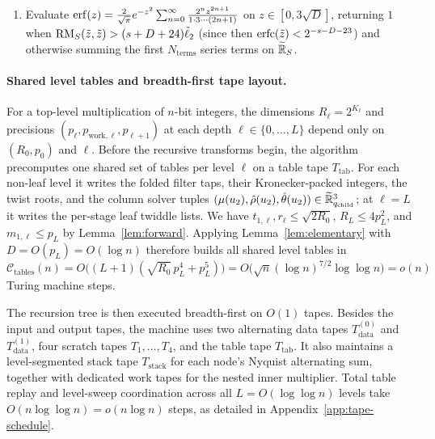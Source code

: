 \begin{lemma}
\begin{enumerate}[label=(\roman*),leftmargin=*]
  \item Evaluate $\operatorname{erf}(z) = \frac{2}{\sqrt{\pi}} e^{-z^2}\allowbreak \sum_{n=0}^\infty \frac{2^n z^{2n+1}}{1 \cdot 3 \cdots (2n+1)}$ on $z \in [0, 3\sqrt{D}]$, returning $1$ when $\operatorname{RM}_S(\tilde{z}, \tilde{z}) > \allowbreak (s + D + 24)\tilde{\ell}_2$ (since then $\operatorname{erfc}(\tilde{z}) < 2^{-s-D-23}$) and otherwise summing the first $N_{\mathrm{terms}}$ series terms on $\widetilde{\mathbb{R}}_S$.
\end{enumerate}
\end{lemma}

\paragraph{Shared level tables and breadth-first tape layout.}
For a top-level multiplication of $n$-bit integers, the dimensions $R_\ell = 2^{K_\ell}$ and precisions $(p_\ell, p_{\mathrm{work},\ell}, p_{\ell+1})$ at each depth $\ell \in \{0, \dots, L\}$ depend only on $(R_0, p_0)$ and $\ell$. Before the recursive transforms begin, the algorithm precomputes one shared set of tables per level $\ell$ on a table tape $T_{\mathrm{tab}}$. For each non-leaf level it writes the folded filter taps, their Kronecker-packed integers, the twist roots, and the column solver tuples $(\mu(u_2),\allowbreak \hat{\rho}(u_2),\allowbreak \hat{\theta}(u_2)) \in \widetilde{\mathbb{R}}_{q_{\mathrm{child}}}^3$; at $\ell = L$ it writes the per-stage leaf twiddle lists. We have $t_{1,\ell}, r_\ell \le \sqrt{2 R_0}$, $R_L \le 4 p_L^2$, and $m_{1,\ell} \le p_L$ by Lemma~\ref{lem:forward}. Applying Lemma~\ref{lem:elementary} with $D = O(p_L) = O(\log n)$ therefore builds all shared level tables in
\begin{equation}\label{eq:table-precomp}
  \mathcal{C}_{\mathrm{tables}}(n) = O\bigl((L + 1)(\sqrt{R_0} \, p_L^4 + p_L^5)\bigr) = O\bigl(\sqrt{n} (\log n)^{7/2} \log \log n\bigr) = o(n)
\end{equation}
Turing machine steps.

The recursion tree is then executed breadth-first on $O(1)$ tapes. Besides the input and output tapes, the machine uses two alternating data tapes $T_{\mathrm{data}}^{(0)}$ and $T_{\mathrm{data}}^{(1)}$, four scratch tapes $T_1, \dots, T_4$, and the table tape $T_{\mathrm{tab}}$. It also maintains a level-segmented stack tape $T_{\mathrm{stack}}$ for each node's Nyquist alternating sum, together with dedicated work tapes for the nested inner multiplier. Total table replay and level-sweep coordination across all $L = O(\log\log n)$ levels take $O(n \log\log n) = o(n \log n)$ steps, as detailed in Appendix~\ref{app:tape-schedule}.

